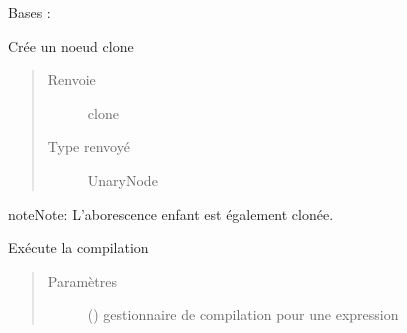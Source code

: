 \documentclass[letterpaper,10pt,french]{sphinxmanual}
\begin{document}
\begin{fulllineitems}
\label{\detokenize{arithmeticexpressionnodes:arithmeticexpressionnodes.InverseNode}}
Bases : {\hyperref[\detokenize{arithmeticexpressionnodes:arithmeticexpressionnodes.ArithmeticExpressionNode}]{}}

\begin{fulllineitems}
\label{\detokenize{arithmeticexpressionnodes:arithmeticexpressionnodes.InverseNode.clone}}
Crée un noeud clone
\begin{quote}\begin{description}
\item[{Renvoie}] \leavevmode
clone

\item[{Type renvoyé}] \leavevmode
UnaryNode

\end{description}\end{quote}

\begin{sphinxadmonition}{note}{Note:}
L’aborescence enfant est également clonée.
\end{sphinxadmonition}

\end{fulllineitems}


\begin{fulllineitems}
\label{\detokenize{arithmeticexpressionnodes:arithmeticexpressionnodes.InverseNode.compile}}
Exécute la compilation
\begin{quote}\begin{description}
\item[{Paramètres}] \leavevmode
{} () \textendash{} gestionnaire de compilation pour une expression


\end{description}
\end{quote}
\end{fulllineitems}
\end{fulllineitems}
\end{document}
